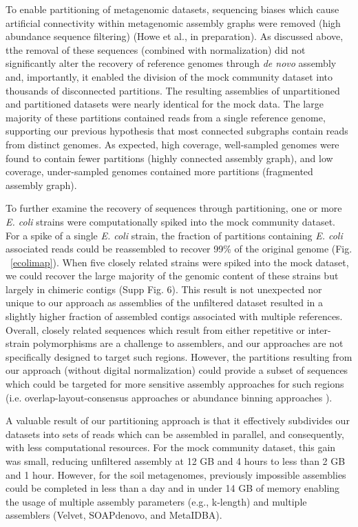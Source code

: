\documentclass[11pt]{article} %
\begin{document}
To enable partitioning of metagenomic datasets, sequencing biases
which cause artificial connectivity within metagenomic assembly graphs
were removed (high abundance sequence filtering) (Howe et al., in preparation).  
As discussed
above, tthe removal of these sequences (combined with normalization)
did not significantly alter the recovery of reference genomes through
{\em de novo} assembly and, importantly, it enabled the division of the mock
community dataset into thousands of disconnected partitions.  The
resulting assemblies of unpartitioned and partitioned datasets were
nearly identical for the mock data.  The large majority of these partitions contained
reads from a single reference genome, supporting our previous
hypothesis that most connected subgraphs contain reads from distinct genomes.  As
expected, high coverage, well-sampled genomes were found to contain
fewer partitions (highly connected assembly graph), and low coverage,
under-sampled genomes contained more partitions (fragmented assembly
graph).

To further examine the recovery of sequences through partitioning, one
or more \emph{E. coli} strains were computationally spiked into the
mock community dataset.  For a spike of a single \emph{E. coli}
strain, the fraction of partitions containing \emph{E. coli}
associated reads could be reassembled to recover 99\% of the original
genome (Fig. ~\ref{ecolimap}).  When five closely related strains were
spiked into the mock dataset, we could recover the large majority of
the genomic content of these strains but largely in chimeric contigs
(Supp Fig. 6).  This result is not unexpected
nor unique to our approach as assemblies of the unfiltered dataset
resulted in a slightly higher fraction of assembled contigs associated
with multiple references.  Overall, closely related sequences which
result from either repetitive or inter-strain polymorphisms are a
challenge to assemblers, and our approaches are not specifically
designed to target such regions.  However, the partitions resulting
from our approach (without digital normalization) could provide a
subset of sequences which could be targeted for more sensitive
assembly approaches for such regions (i.e. overlap-layout-consensus
approaches or abundance binning approaches \cite{Sharon:2012kx}).

A valuable result of our partitioning approach is that it effectively
subdivides our datasets into sets of reads which can be assembled in
parallel, and consequently, with less computational resources.  For
the mock community dataset, this gain was small, reducing unfiltered
assembly at 12 GB and 4 hours to less than 2 GB and 1 hour.  However,
for the soil metagenomes, previously impossible assemblies could be
completed in less than a day and in under 14 GB of memory enabling the
usage of multiple assembly parameters (e.g., k-length) and multiple
assemblers (Velvet, SOAPdenovo, and MetaIDBA).
\end{document}
